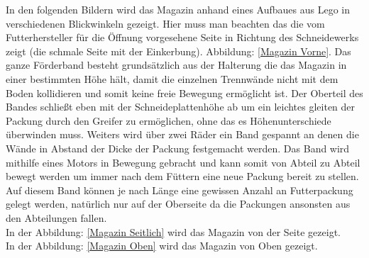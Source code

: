 In den folgenden Bildern wird das Magazin anhand eines Aufbaues aus Lego in verschiedenen Blickwinkeln gezeigt. Hier muss man beachten das die vom Futterhersteller für die Öffnung vorgesehene Seite in Richtung des Schneidewerks zeigt (die schmale Seite mit der Einkerbung). Abbildung: \ref{Magazin Vorne}.
Das ganze Förderband besteht grundsätzlich aus der Halterung die das Magazin in einer bestimmten Höhe hält, damit die einzelnen Trennwände nicht mit dem Boden kollidieren und somit keine freie Bewegung ermöglicht ist. Der Oberteil des Bandes schließt eben mit der Schneideplattenhöhe ab um ein leichtes gleiten der Packung durch den Greifer zu ermöglichen, ohne das es Höhenunterschiede überwinden muss. Weiters wird über zwei Räder ein Band gespannt an denen die Wände in Abstand der Dicke der Packung festgemacht werden. Das Band wird mithilfe eines Motors in Bewegung gebracht und kann somit von Abteil zu Abteil bewegt werden um immer nach dem Füttern eine neue Packung bereit zu stellen. Auf diesem Band können je nach Länge eine gewissen Anzahl an Futterpackung gelegt werden, natürlich nur auf der Oberseite da die Packungen ansonsten aus den Abteilungen fallen.\\

In der Abbildung: \ref{Magazin Seitlich} wird das Magazin von der Seite gezeigt. \\
In der Abbildung: \ref{Magazin Oben} wird das Magazin von Oben gezeigt. 

